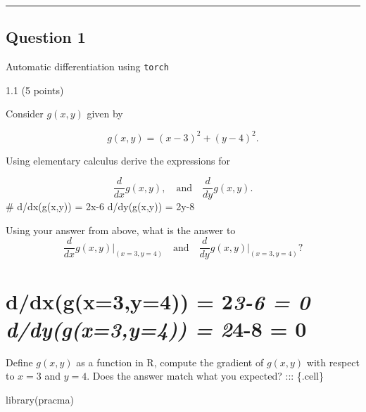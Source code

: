 \documentclass[
  letterpaper,
  DIV=11,
  numbers=noendperiod]{scrartcl}
\newenvironment{Shaded}{\begin{snugshade}}{\end{snugshade}}
\newcommand{\FunctionTok}[1]{\textcolor[rgb]{0.28,0.35,0.67}{#1}}
\newcommand{\NormalTok}[1]{\textcolor[rgb]{0.00,0.23,0.31}{#1}}
\begin{document}
\begin{center}\rule{0.5\linewidth}{0.5pt}\end{center}

\hypertarget{question-1}{%
\subsection{Question 1}\label{question-1}}

\begin{tcolorbox}[enhanced jigsaw, breakable, opacitybacktitle=0.6, colbacktitle=quarto-callout-tip-color!10!white, colframe=quarto-callout-tip-color-frame, rightrule=.15mm, toptitle=1mm, left=2mm, titlerule=0mm, coltitle=black, opacityback=0, leftrule=.75mm, bottomtitle=1mm, arc=.35mm, toprule=.15mm, bottomrule=.15mm, title=\textcolor{quarto-callout-tip-color}{\faLightbulb}\hspace{0.5em}{30 points}, colback=white]

Automatic differentiation using \texttt{torch}

\end{tcolorbox}

1.1 (5 points)

Consider \(g(x, y)\) given by

\[
g(x, y) = (x - 3)^2 + (y - 4)^2.
\]

Using elementary calculus derive the expressions for

\[
\frac{d}{dx}g(x, y), \quad \text{and} \quad \frac{d}{dy}g(x, y).
\] \# d/dx(g(x,y)) = 2x-6 d/dy(g(x,y)) = 2y-8

Using your answer from above, what is the answer to \[
\frac{d}{dx}g(x, y) \Bigg|_{(x=3, y=4)} \quad \text{and} \quad \frac{d}{dy}g(x, y) \Bigg|_{(x=3, y=4)} ?
\]

\hypertarget{ddxgx3y4-23-6-0-ddygx3y4-24-8-0}{%
\section{\texorpdfstring{d/dx(g(x=3,y=4)) = 2\emph{3-6 = 0
d/dy(g(x=3,y=4)) = 2}4-8 =
0}{d/dx(g(x=3,y=4)) = 23-6 = 0 d/dy(g(x=3,y=4)) = 24-8 = 0}}\label{ddxgx3y4-23-6-0-ddygx3y4-24-8-0}}

Define \(g(x, y)\) as a function in R, compute the gradient of
\(g(x, y)\) with respect to \(x=3\) and \(y=4\). Does the answer match
what you expected? ::: \{.cell\}

\begin{Shaded}
\begin{Highlighting}[]
\FunctionTok{library}\NormalTok{(pracma)}
\end{Highlighting}
\end{Shaded}
\end{document}
